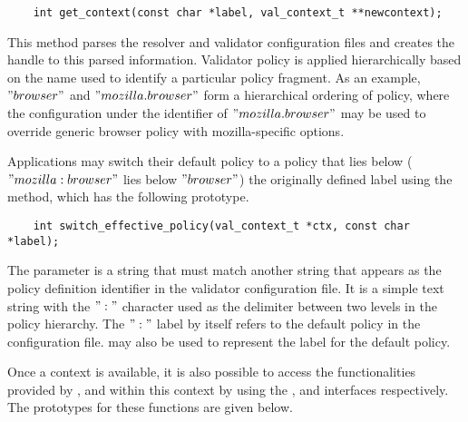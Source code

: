 \begin{verbatim}
    int get_context(const char *label, val_context_t **newcontext);
\end{verbatim}
                                                                                                                             
This method parses the resolver and validator configuration
files and creates the handle  to this parsed information.
Validator policy is applied hierarchically
based on the name used to identify a particular policy fragment.
As an example, $"browser"$ and $"mozilla.browser"$ form a hierarchical
ordering of policy, where the configuration under the identifier of
$"mozilla.browser"$ may be used to override generic browser policy with
mozilla-specific options.
                                                                                                                             
Applications may switch their default policy
to a policy that lies below ($"mozilla:browser"$ lies below $"browser"$) the
originally defined label using the 
 method, which has the following prototype.

\begin{verbatim} 
    int switch_effective_policy(val_context_t *ctx, const char *label);
\end{verbatim}    
                                                                                                                         
The  parameter is a string that must match another string
that appears as the policy definition identifier in the validator configuration file.
It is a simple text string with the $":"$ character used as the delimiter
between two levels in the policy hierarchy. The $":"$ label by itself refers to
the default policy in the configuration file.  may also be used to
represent the label for the default policy.
                                                                                                                             
Once a context is available, it is also possible to access the
functionalities provided by ,
 and  within this
context by using the , 
and  interfaces respectively. The prototypes
for these functions are given below.
                                                                      
